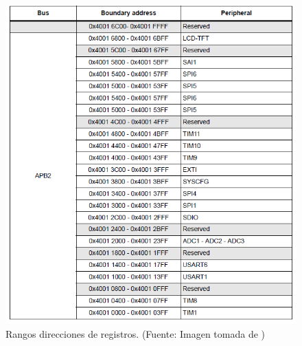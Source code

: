 \begin{figure}[H]
\centering
\includegraphics[scale=0.8]{./Figuras/Nota_teorica/REGS2}
\caption{Rangos direcciones de registros. (Fuente: Imagen tomada de \cite{ST})}
\label{fig:REGS2}
\end{figure}

